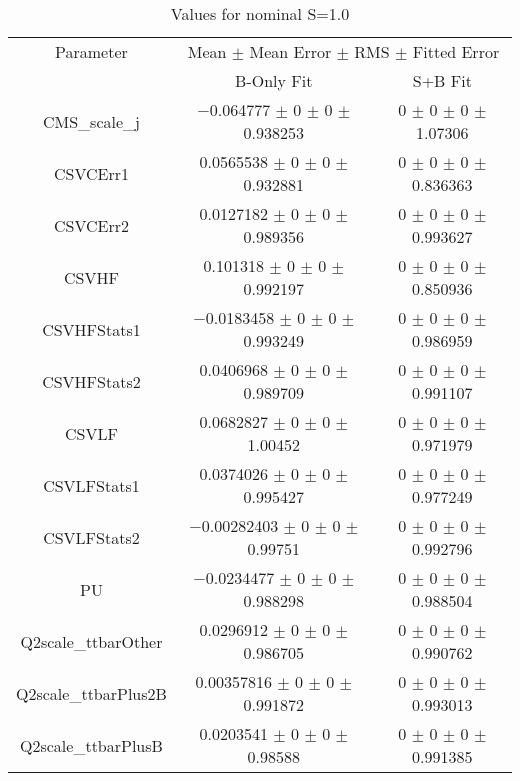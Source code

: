 \begin{table}
\centering
\caption{Values for nominal S=1.0}
\begin{tabular}{ccc}
\toprule
Parameter & \multicolumn{2}{c}{Mean $\pm$ Mean Error $\pm$ RMS $\pm$ Fitted Error}\\
 & B-Only Fit & S+B Fit\\
\midrule
CMS\_scale\_j & \num{-0.064777} $\pm$ \num{0} $\pm$ \num{0} $\pm$ \num{0.938253} & \num{0} $\pm$ \num{0} $\pm$ \num{0} $\pm$ \num{1.07306}\\
CSVCErr1 & \num{0.0565538} $\pm$ \num{0} $\pm$ \num{0} $\pm$ \num{0.932881} & \num{0} $\pm$ \num{0} $\pm$ \num{0} $\pm$ \num{0.836363}\\
CSVCErr2 & \num{0.0127182} $\pm$ \num{0} $\pm$ \num{0} $\pm$ \num{0.989356} & \num{0} $\pm$ \num{0} $\pm$ \num{0} $\pm$ \num{0.993627}\\
CSVHF & \num{0.101318} $\pm$ \num{0} $\pm$ \num{0} $\pm$ \num{0.992197} & \num{0} $\pm$ \num{0} $\pm$ \num{0} $\pm$ \num{0.850936}\\
CSVHFStats1 & \num{-0.0183458} $\pm$ \num{0} $\pm$ \num{0} $\pm$ \num{0.993249} & \num{0} $\pm$ \num{0} $\pm$ \num{0} $\pm$ \num{0.986959}\\
CSVHFStats2 & \num{0.0406968} $\pm$ \num{0} $\pm$ \num{0} $\pm$ \num{0.989709} & \num{0} $\pm$ \num{0} $\pm$ \num{0} $\pm$ \num{0.991107}\\
CSVLF & \num{0.0682827} $\pm$ \num{0} $\pm$ \num{0} $\pm$ \num{1.00452} & \num{0} $\pm$ \num{0} $\pm$ \num{0} $\pm$ \num{0.971979}\\
CSVLFStats1 & \num{0.0374026} $\pm$ \num{0} $\pm$ \num{0} $\pm$ \num{0.995427} & \num{0} $\pm$ \num{0} $\pm$ \num{0} $\pm$ \num{0.977249}\\
CSVLFStats2 & \num{-0.00282403} $\pm$ \num{0} $\pm$ \num{0} $\pm$ \num{0.99751} & \num{0} $\pm$ \num{0} $\pm$ \num{0} $\pm$ \num{0.992796}\\
PU & \num{-0.0234477} $\pm$ \num{0} $\pm$ \num{0} $\pm$ \num{0.988298} & \num{0} $\pm$ \num{0} $\pm$ \num{0} $\pm$ \num{0.988504}\\
Q2scale\_ttbarOther & \num{0.0296912} $\pm$ \num{0} $\pm$ \num{0} $\pm$ \num{0.986705} & \num{0} $\pm$ \num{0} $\pm$ \num{0} $\pm$ \num{0.990762}\\
Q2scale\_ttbarPlus2B & \num{0.00357816} $\pm$ \num{0} $\pm$ \num{0} $\pm$ \num{0.991872} & \num{0} $\pm$ \num{0} $\pm$ \num{0} $\pm$ \num{0.993013}\\
Q2scale\_ttbarPlusB & \num{0.0203541} $\pm$ \num{0} $\pm$ \num{0} $\pm$ \num{0.98588} & \num{0} $\pm$ \num{0} $\pm$ \num{0} $\pm$ \num{0.991385}\\

\end{tabular}
\end{table}
